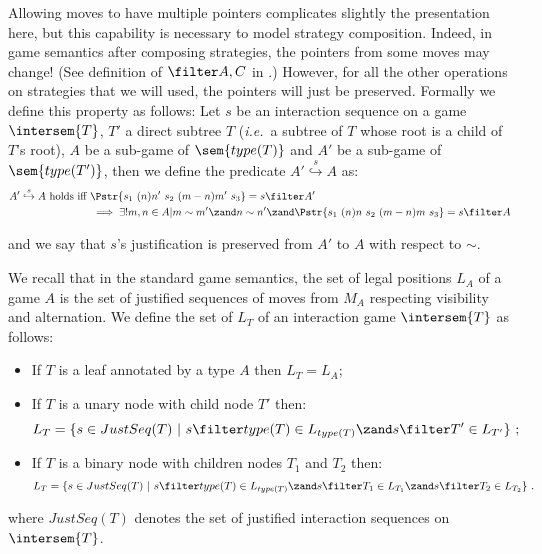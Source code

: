 Allowing moves to have multiple pointers complicates slightly the
presentation here, but this capability is necessary to model
strategy composition. Indeed, in game semantics after composing
strategies, the pointers from some moves may change! (See definition
of $\filter A,C$ in \cite{abramsky:game-semantics-tutorial}.)
However, for all the other operations on strategies that we will
used, the pointers will just be preserved. Formally we define this
property as follows: Let $s$ be an  interaction sequence on a game
$\intersem{T}$, $T'$ a direct subtree $T$ ({\it i.e.}~a subtree of
$T$ whose root is a child of $T$'s root), $A$ be a sub-game of
$\sem{type(T)}$ and $A'$ be a sub-game of $\sem{type(T')}$, then we
define the predicate $A'\stackrel{s}\hookrightarrow A$ as:
\begin{align*}
 A'\stackrel{s}\hookrightarrow A \mbox{ holds iff } &
 \Pstr{s_1\ (n){n'}\ s_2\ (m-n){m'}\ s_3 } = s\filter A'  \\
 & \implies \exists! m,n \in A | m \sim m' \zand n \sim n' \zand \Pstr{s_1\
(n){n}\  s_2\ (m-n){m}\ s_3} = s\filter A
\end{align*}

and we say that $s$'s justification is preserved from $A'$ to $A$
with respect to $\sim$.



\begin{definition} We recall
that in the standard game semantics, the set of legal positions
$L_A$ of a game $A$ is the set of justified sequences of moves from
$M_A$ respecting visibility and alternation. We define the set of
\defname{legal uncovered position} $L_T$ of an interaction game $\intersem{T}$ as
follows:
    \begin{itemize}
    \item If $T$ is a leaf annotated by a type $A$ then $L_T =
    L_A$;
    \item If $T$ is a unary node with child node $T'$ then:
    $$L_T = \{ s \in JustSeq(T) \ | \ s \filter type(T) \in L_{type(T)} \zand  s \filter T' \in L_{T'} \} \ ;$$
    \item If $T$ is a binary node with children nodes $T_1$ and $T_2$ then:
    $$L_T = \{ s \in JustSeq(T) \ | \ s \filter type(T) \in L_{type(T)} \zand  s \filter T_1 \in L_{T_1}
    \zand  s \filter T_2 \in L_{T_2} \} \ .$$
    \end{itemize}
    where $JustSeq(T)$ denotes the set of justified interaction sequences on
    $\intersem{T}$.
\end{definition}

